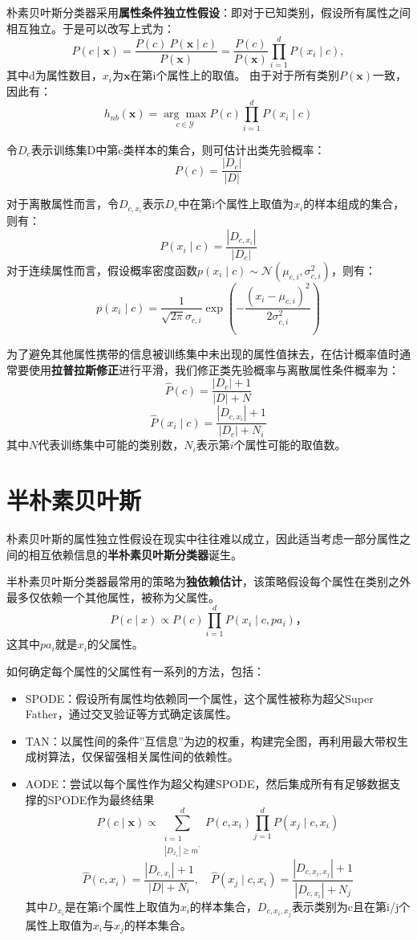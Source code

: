 朴素贝叶斯分类器采用\textbf{属性条件独立性假设}：即对于已知类别，假设所有属性之间相互独立。于是可以改写上式为：
\[
P(c \mid \boldsymbol{x})=\frac{P(c)\  P(\boldsymbol{x} \mid c)}{P(\boldsymbol{x})}=\frac{P(c)}{P(\boldsymbol{x})} \prod_{i=1}^{d} P\left(x_{i} \mid c\right),
\]
其中d为属性数目，$x_i$为$\boldsymbol x$在第i个属性上的取值。
由于对于所有类别$P(\boldsymbol x)$一致，因此有：
\[
h_{n b}(\boldsymbol{x})=\underset{c \in \mathcal{Y}}{\arg \max } P(c) \prod_{i=1}^{d} P\left(x_{i} \mid c\right)
\]

令$D_c$表示训练集D中第c类样本的集合，则可估计出类先验概率：
\[
    P(c) = \frac{| D_c|}{|D|}
\]

对于离散属性而言，令$D_{c,x_i}$表示$D_c$中在第i个属性上取值为$x_i$的样本组成的集合，则有：
\[
    P(x_i\mid c) =\frac{|D_{c,x_i}|}{|D_c|}
\]
对于连续属性而言，假设概率密度函数$p(x_i\mid c) \sim \mathcal{N}(\mu_{c,i},\sigma^2_{c,i})$，则有：
\[
p\left(x_{i} \mid c\right)=\frac{1}{\sqrt{2 \pi} \sigma_{c, i}} \exp \left(-\frac{\left(x_{i}-\mu_{c, i}\right)^{2}}{2 \sigma_{c, i}^{2}}\right)
\]

为了避免其他属性携带的信息被训练集中未出现的属性值抹去，在估计概率值时通常要使用\textbf{拉普拉斯修正}进行平滑，我们修正类先验概率与离散属性条件概率为：
\[
    \hat{P}(c) = \frac{|D_c|+1}{|D|+N}
\]
\[
    \hat{P}(x_i\mid c) = \frac{|D_{c,x_i}|+1}{|D_c|+N_i}
\]
其中$N$代表训练集中可能的类别数，$N_i$表示第$i$个属性可能的取值数。

\section{半朴素贝叶斯}\label{sec:7.3}
朴素贝叶斯的属性独立性假设在现实中往往难以成立，因此适当考虑一部分属性之间的相互依赖信息的\textbf{半朴素贝叶斯分类器}诞生。

半朴素贝叶斯分类器最常用的策略为\textbf{独依赖估计}，该策略假设每个属性在类别之外最多仅依赖一个其他属性，被称为父属性。\[
P(c \mid x) \propto P(c) \prod_{i=1}^{d} P\left(x_{i} \mid c, p a_{i}\right)，
\]这其中$pa_i$就是$x_i$的父属性。

如何确定每个属性的父属性有一系列的方法，包括：
\begin{itemize}
    \item SPODE：假设所有属性均依赖同一个属性，这个属性被称为超父Super Father，通过交叉验证等方式确定该属性。
    \item TAN：以属性间的条件”互信息”为边的权重，构建完全图，再利用最大带权生成树算法，仅保留强相关属性间的依赖性。
    \item AODE：尝试以每个属性作为超父构建SPODE，然后集成所有有足够数据支撑的SPODE作为最终结果\[
P(c \mid \boldsymbol{x}) \propto \sum_{\substack{i=1 \\\left|D_{x_{i}}\right| \geqslant m^{\prime}}}^{d} P\left(c, x_{i}\right) \prod_{j=1}^{d} P\left(x_{j} \mid c, x_{i}\right)
\]
\[
\hat{P}\left(c, x_{i}\right)=\frac{\left|D_{c, x_{i}}\right|+1}{|D|+N_{i}}, \quad \hat{P}\left(x_{j} \mid c, x_{i}\right)=\frac{\left|D_{c, x_{i}, x_{j}}\right|+1}{\left|D_{c, x_{i}}\right|+N_{j}}
\]其中$D_{x_i}$是在第i个属性上取值为$x_i$的样本集合，$D_{c,x_i,x_j}$表示类别为c且在第i/j个属性上取值为$x_i$与$x_j$的样本集合。
\end{itemize}


